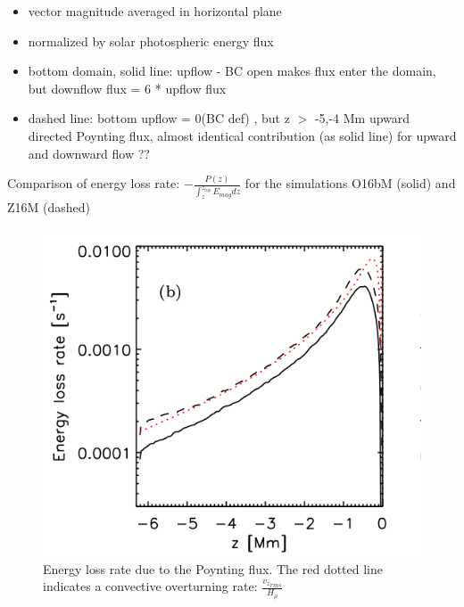 \documentclass{beamer}
\begin{document}
\begin{frame}

\begin{itemize}
\item vector magnitude averaged in horizontal plane
\item normalized by solar photospheric energy flux
\item bottom domain, solid line: upflow - BC open makes flux enter the domain, but downflow flux = 6 * upflow flux
\item dashed line: bottom upflow = 0(BC def) , but z $>$ -5,-4 Mm upward directed Poynting flux, almost identical contribution (as solid line) for upward and downward flow ??
\end{itemize}

\end{frame}
\begin{frame}{Comparison of energy loss rate: $-\frac{P(z)}{\int_z^{z_{top}}{E_{mag} dz }}$   for the simulations O16bM (solid) and Z16M (dashed)}

\begin{figure}[H]
 \centering
 \includegraphics[scale=0.3]{poynting2.png}
	\caption{Energy loss rate due to the Poynting flux. The
red dotted line indicates a convective overturning rate: $\frac{{v_z}_{rms}}{H_{\rho}}$}
\end{figure}

\end{frame}
\end{document}
